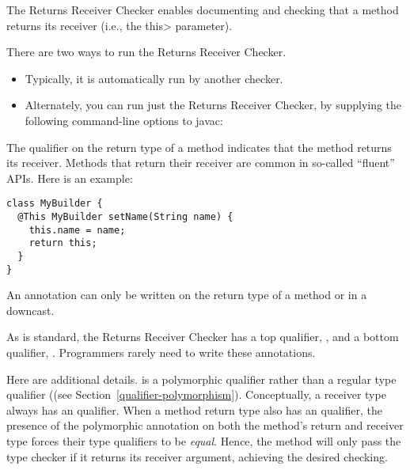 \htmlhr
{}

The Returns Receiver Checker enables documenting and checking that a method
returns its receiver (i.e., the \<this> parameter).

There are two ways to run the Returns Receiver Checker.
\begin{itemize}
\item
Typically, it is automatically run by another checker.
\item
Alternately, you can run just the Returns Receiver Checker, by
supplying the following command-line options to javac:
\end{itemize}



The qualifier  on the return
type of a method indicates that the method returns its receiver.  Methods
that return their receiver are common in so-called ``fluent'' APIs.  Here
is an example:

\begin{Verbatim}
class MyBuilder {
  @This MyBuilder setName(String name) {
    this.name = name;
    return this;
  }
}
\end{Verbatim}

An  annotation can only be
written on the return type of a method or in a downcast.

As is standard, the Returns Receiver Checker has a top qualifier,
, and a bottom qualifier,
.
Programmers rarely need to write these annotations.

Here are additional details.  
is a polymorphic qualifier rather than a regular type qualifier ((see
Section~\ref{qualifier-polymorphism}). Conceptually, a receiver type always has
an  qualifier. When a method
return type also has an 
qualifier, the presence of the polymorphic annotation on both the method's
return and receiver type forces their type qualifiers to be \emph{equal}. Hence,
the method will only pass the type checker if it returns its receiver argument,
achieving the desired checking.



